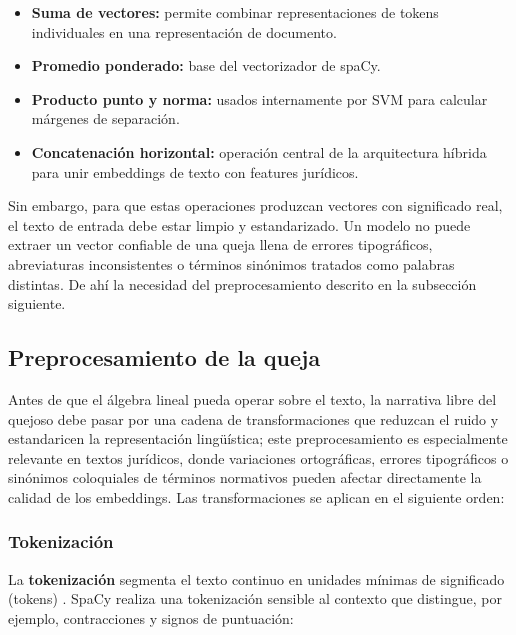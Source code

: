 \begin{itemize}
  \item \textbf{Suma de vectores:} permite combinar representaciones de tokens
        individuales en una representación de documento.
  \item \textbf{Promedio ponderado:} base del vectorizador de spaCy.
  \item \textbf{Producto punto y norma:} usados internamente por SVM para
        calcular márgenes de separación.
  \item \textbf{Concatenación horizontal:} operación central de la arquitectura
        híbrida para unir embeddings de texto con features jurídicos.
\end{itemize}

Sin embargo, para que estas operaciones produzcan vectores con significado real,
el texto de entrada debe estar limpio y estandarizado. Un modelo no puede extraer
un vector confiable de una queja llena de errores tipográficos, abreviaturas
inconsistentes o términos sinónimos tratados como palabras distintas. De ahí la
necesidad del preprocesamiento descrito en la subsección siguiente.

\subsection{Preprocesamiento de la queja}

Antes de que el álgebra lineal pueda operar sobre el texto, la narrativa libre
del quejoso debe pasar por una cadena de transformaciones que reduzcan el ruido
y estandaricen la representación lingüística; este preprocesamiento es
especialmente relevante en textos jurídicos, donde variaciones ortográficas,
errores tipográficos o sinónimos coloquiales de términos normativos pueden afectar
directamente la calidad de los embeddings. Las transformaciones se aplican en el
siguiente orden:

\subsubsection*{Tokenización}

La \textbf{tokenización} segmenta el texto continuo en unidades mínimas de
significado (tokens) \cite{jurafsky2023}. SpaCy realiza una tokenización sensible al contexto que
distingue, por ejemplo, contracciones y signos de puntuación:

